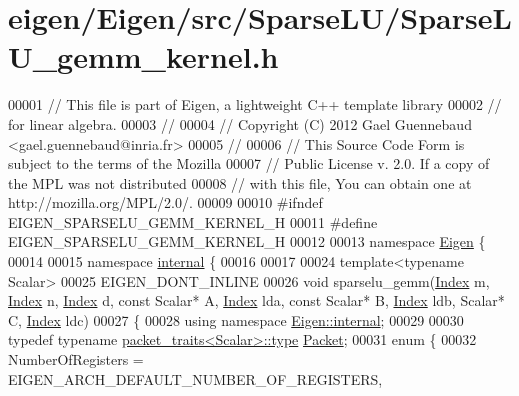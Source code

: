 \hypertarget{eigen_2_eigen_2src_2_sparse_l_u_2_sparse_l_u__gemm__kernel_8h_source}{}\section{eigen/\+Eigen/src/\+Sparse\+L\+U/\+Sparse\+L\+U\+\_\+gemm\+\_\+kernel.h}
\label{eigen_2_eigen_2src_2_sparse_l_u_2_sparse_l_u__gemm__kernel_8h_source}

\begin{DoxyCode}
00001 \textcolor{comment}{// This file is part of Eigen, a lightweight C++ template library}
00002 \textcolor{comment}{// for linear algebra.}
00003 \textcolor{comment}{//}
00004 \textcolor{comment}{// Copyright (C) 2012 Gael Guennebaud <gael.guennebaud@inria.fr>}
00005 \textcolor{comment}{//}
00006 \textcolor{comment}{// This Source Code Form is subject to the terms of the Mozilla}
00007 \textcolor{comment}{// Public License v. 2.0. If a copy of the MPL was not distributed}
00008 \textcolor{comment}{// with this file, You can obtain one at http://mozilla.org/MPL/2.0/.}
00009 
00010 \textcolor{preprocessor}{#ifndef EIGEN\_SPARSELU\_GEMM\_KERNEL\_H}
00011 \textcolor{preprocessor}{#define EIGEN\_SPARSELU\_GEMM\_KERNEL\_H}
00012 
00013 \textcolor{keyword}{namespace }\hyperlink{namespace_eigen}{Eigen} \{
00014 
00015 \textcolor{keyword}{namespace }\hyperlink{namespaceinternal}{internal} \{
00016 
00017 
00024 \textcolor{keyword}{template}<\textcolor{keyword}{typename} Scalar>
00025 EIGEN\_DONT\_INLINE
00026 \textcolor{keywordtype}{void} sparselu\_gemm(\hyperlink{namespace_eigen_a62e77e0933482dafde8fe197d9a2cfde}{Index} m, \hyperlink{namespace_eigen_a62e77e0933482dafde8fe197d9a2cfde}{Index} n, \hyperlink{namespace_eigen_a62e77e0933482dafde8fe197d9a2cfde}{Index} d, \textcolor{keyword}{const} Scalar* A, 
      \hyperlink{namespace_eigen_a62e77e0933482dafde8fe197d9a2cfde}{Index} lda, \textcolor{keyword}{const} Scalar* B, \hyperlink{namespace_eigen_a62e77e0933482dafde8fe197d9a2cfde}{Index} ldb, Scalar* C, \hyperlink{namespace_eigen_a62e77e0933482dafde8fe197d9a2cfde}{Index} ldc)
00027 \{
00028   \textcolor{keyword}{using namespace }\hyperlink{namespace_eigen_1_1internal}{Eigen::internal};
00029   
00030   \textcolor{keyword}{typedef} \textcolor{keyword}{typename} \hyperlink{struct_eigen_1_1internal_1_1packet__traits}{packet\_traits<Scalar>::type} \hyperlink{union_eigen_1_1internal_1_1_packet}{Packet};
00031   \textcolor{keyword}{enum} \{
00032     NumberOfRegisters = EIGEN\_ARCH\_DEFAULT\_NUMBER\_OF\_REGISTERS,

\end{DoxyCode}
